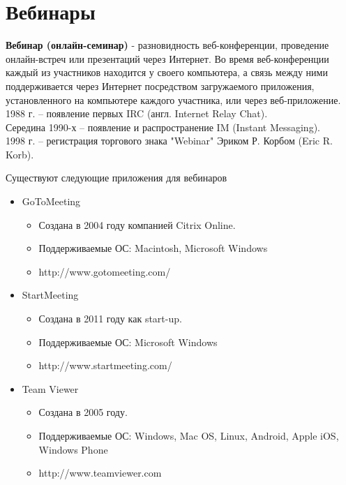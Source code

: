 \section{Вебинары}
\textbf{Вебинар (онлайн-семинар)} - разновидность веб-конференции, проведение онлайн-встреч или презентаций через Интернет. Во время веб-конференции каждый из участников находится у своего компьютера, а связь между ними поддерживается через Интернет посредством загружаемого приложения, установленного на компьютере каждого участника, или через веб-приложение.
\\1988 г. – появление первых IRC (англ. Internet Relay Chat).
\\Середина 1990-х – появление и распространение IM (Instant Messaging).
\\1998 г. – регистрация торгового знака "Webinar" Эриком Р. Корбом (Eric R. Korb).
\begin{center}
  Существуют следующие приложения для вебинаров
\end{center}
\begin{itemize}
  \item GoToMeeting
    \begin{itemize}
    \item Создана в 2004 году компанией Citrix Online.
    \item Поддерживаемые ОС: Macintosh, Microsoft Windows
    \item http://www.gotomeeting.com/
  \end{itemize}
  \item StartMeeting
    \begin{itemize}
    \item Создана в 2011 году как start-up.
    \item Поддерживаемые ОС: Microsoft Windows
    \item http://www.startmeeting.com/
  \end{itemize}
  \item Team Viewer
    \begin{itemize}
    \item Создана в 2005 году.
    \item Поддерживаемые ОС: Windows, Mac OS, Linux, Android, Apple iOS, Windows Phone
    \item http://www.teamviewer.com
  \end{itemize}
\end{itemize}
